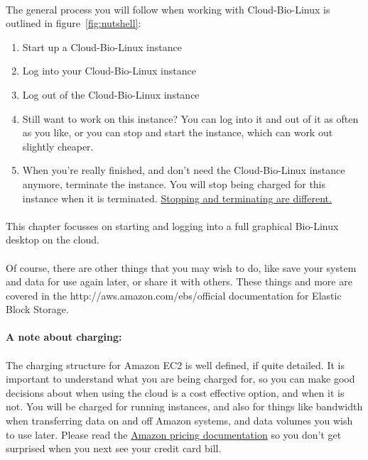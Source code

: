 \paragraph{}The general process you will follow when working with Cloud-Bio-Linux is outlined in figure~\ref{fig:nutshell}:
\begin{enumerate}
\item Start up a Cloud-Bio-Linux instance
\item Log into your Cloud-Bio-Linux instance
\item Log out of the  Cloud-Bio-Linux instance
\item Still want to work on this instance? You can log into it and out of it as often as you like, or you can stop and start the instance, which can work out slightly cheaper.
\item When you're really finished, and don't need the Cloud-Bio-Linux instance anymore, terminate the instance. You will stop being charged for this instance when it is terminated. \href{http://support.rightscale.com/06-FAQs/FAQ\_0149\_-_What\%27s_the_difference_between_Terminating_and_Stopping_an_EC2_Instance\%3F}{Stopping and terminating are different.}
\end{enumerate}

\paragraph{}This chapter focusses on starting and logging into a full graphical Bio-Linux desktop on the cloud.

\paragraph{}Of course, there are other things that you may wish to do, like save your system and data for use again later, or share it with others. These things and more are covered in the {http://aws.amazon.com/ebs/}{official documentation for Elastic Block Storage}.

\paragraph{A note about charging:} 
\paragraph{}The charging structure for Amazon EC2 is well defined, if quite detailed. It is important to understand what you are being charged for, so you can make good decisions about when using the cloud is a cost effective option, and when it is not. You will be charged for running instances, and also for things like bandwidth when transferring data on and off Amazon systems, and data volumes you wish to use later. Please read the \href{http://aws.amazon.com/ec2/pricing/}{Amazon pricing documentation} so you don't get surprised when you next see your credit card bill. 
